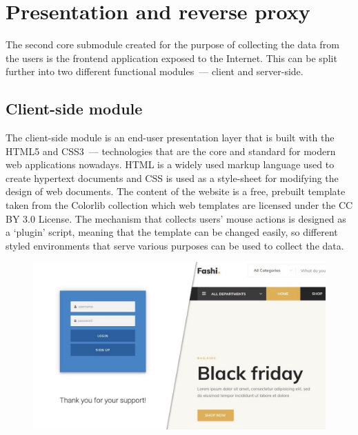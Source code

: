 \section{Presentation and reverse proxy}\label{sec:reverse-proxy}
The second core submodule created for the purpose of collecting the data from the users is the frontend application exposed to the Internet.
This can be split further into two different functional modules~--- client and server-side.

\subsection{Client-side module}\label{subsec:client-side-module}
The client-side module is an end-user presentation layer that is built with the HTML5 and CSS3~--- technologies that are the core and standard for modern web applications nowadays.
HTML is a widely used markup language used to create hypertext documents and CSS is used as a style-sheet for modifying the design of web documents.
The content of the website is a free, prebuilt template taken from the Colorlib collection which web templates are licensed under the CC BY 3.0 License.
The mechanism that collects users' mouse actions is designed as a `plugin' script, meaning that the template can be changed easily, so different styled environments that serve various purposes can be used to collect the data.

\begin{figure}[hbt!]
    \centering
    \includegraphics[width=0.7\linewidth]{resources/frontpage.jpeg}
    \label{fig:frontpage}
\end{figure}

